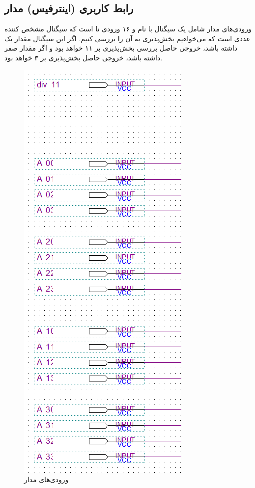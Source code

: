 \documentclass[12pt,onecolumn,a4paper,fleqn]{article}
\begin{document}
	\subsection{رابط کاربری (اینترفیس) مدار}
	ورودی‌های مدار شامل یک سیگنال با نام 
	و ۱۶ ورودی 
	تا
	است که سیگنال
	مشخص کننده عددی‌ است که می‌خواهیم بخش‌پذیری به آن را بررسی کنیم. اگر این سیگنال مقدار یک داشته باشد، خروجی حاصل بررسی بخش‌پذیری بر ۱۱ خواهد بود و اگر مقدار صفر داشته باشد، خروجی حاصل بخش‌پذیری بر ۳ خواهد بود.
	\begin{figure}[H]
		\centering
		\includegraphics[scale=0.45]{source/inputs.png}
		\caption{ورودی‌های مدار}
	\end{figure}
\end{document}
